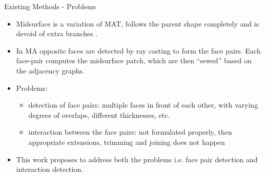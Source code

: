 \begin{frame}{Existing Methods - Problems}
\begin{itemize}[noitemsep,label=\textbullet,topsep=2pt,parsep=2pt,partopsep=2pt]
\item Midsurface is a variation of MAT, follows the parent shape completely and is devoid of extra branches \cite{Ramanathan2004}.
\item  In MA opposite faces are detected by ray casting to form the face pairs.  Each face-pair computes the  midsurface patch, which are then ``sewed'' based  on  the  adjacency  graphs.
\item Problems:
	\begin{itemize}[noitemsep,label=\textbullet,topsep=2pt,parsep=2pt,partopsep=2pt]
	\item detection of face pairs: multiple faces in front of each other, with varying degrees of overlaps, different thicknesses, etc.
	\item interaction between the face pairs: not formulated properly, then appropriate extensions, trimming and joining does not happen
	\end{itemize}
\item This work proposes to address both the problems i.e. face pair detection and interaction detection.	
\end{itemize}
\end{frame}
